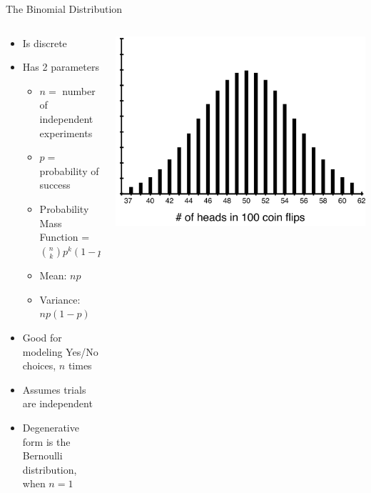 \documentclass[aspectratio=169]{beamer}
\begin{document}
\begin{frame}{The Binomial Distribution}

\begin{columns}[c]
\begin{column}{0.6\textwidth}
\begin{itemize}
\item Is discrete
\item Has 2 parameters 
\begin{itemize}
	\item $n =$ number of independent experiments
	\item $p =$ probability of success
	\item Probability Mass Function = ${n \choose k} p^k(1-p)^{(n-k)}$
	\item Mean: $np$
	\item Variance: $np(1-p)$
	\end{itemize}
\item Good for modeling Yes/No choices, $n$ times
\item Assumes trials are independent 
\item Degenerative form is the Bernoulli distribution, when $n=1$
\end{itemize}
\end{column}
\begin{column}{0.4\textwidth}
\includegraphics[width=1\textwidth]{lectModel1/binomDistribution.pdf}
\end{column}
\end{columns}
\end{frame}
\end{document}
